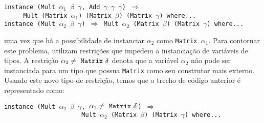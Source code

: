 \begin{center}
\texttt{instance (Mult $\alpha_{1}$ $\beta$ $\gamma$, Add $\gamma$ $\gamma$ $\gamma$) $\Rightarrow$ $\,\,\,\,\,\,\,\,\,\,\,\,\,\,\,\,\,\,\,\,\,\,\,\,\,\,\,\,\,\,\,\,\,\,\,\,\,\,\,\,\,\,\,\,\,\,\,\,\,\,\,\,\,\,\,\,\,\,\,\,\,\,\,\,\,\,\,\,\,\,\,\,\,\,\,\,\,\,\,\,\,\,\,\,$\\
$\,\,\,\,\,\,\,\,\,\,\,\,\,$ Mult (Matrix $\alpha_{1}$) (Matrix $\beta$) (Matrix $\gamma$) where...}\\
\texttt{instance (Mult $\alpha_{2}$ $\beta$ $\gamma$) $\Rightarrow$ Mult $\alpha_{2}$ (Matrix $\beta$) (Matrix $\gamma$) where...}
\end{center}
uma vez que h\'a a possibilidade de instanciar $\alpha_{2}$ como \texttt{Matrix $\alpha_{1}$}. Para contornar este 
problema, \cite{Duggan02a} utilizam restri\c{c}\~oes que impedem a instancia\c{c}\~ao de vari\'aveis de tipos. 
A restri\c{c}\~ao $\alpha_{2}\neq\text{ \texttt{Matrix} }\delta$ denota que a vari\'avel $\alpha_{2}$ n\~ao pode
ser instanciada para um tipo que possua \texttt{Matrix} como seu construtor mais externo. Usando este novo tipo de 
restri\c{c}\~ao, temos que o trecho de c\'odigo anterior \'e representado como:
\begin{center}
\texttt{instance (Mult $\alpha_{2}$ $\beta$ $\gamma$, $\alpha_{2}\neq\text{ \texttt{Matrix} }\delta$) $\Rightarrow$ \\$\,\,\,\,\,\,\,\,\,\,\,\,\,\,\,\,\,\,\,\,\,\,\,\,\,\,\,\,\,\,\,\,\,\,\,\,\,\,\,\,\,\,\,\,\,\,\,\,\,\,\,\,\,\,\,\,\,\,\,\,\,\,\,\,\,$Mult $\alpha_{2}$ (Matrix $\beta$) (Matrix $\gamma$) where...}
\end{center} 
  

